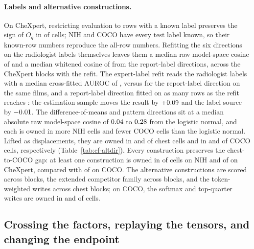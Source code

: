 \documentclass{article}
\begin{document}
\paragraph{Labels and alternative constructions.} On CheXpert, restricting evaluation to rows with a known label preserves the sign of $O_q$ in \cfValKnownSignAgree{} of \cfValKnownN{} cells; NIH and COCO have every test label known, so their known-row numbers reproduce the all-row numbers. Refitting the six directions on the radiologist labels themselves leaves them a median raw model-space cosine of \cfValidfitCosRaw{} and a median whitened cosine of \cfValidfitCosWhitened{} from the report-label directions, across the \cfValidfitBlocks{} CheXpert blocks with the refit. The expert-label refit reads the radiologist labels with a median cross-fitted AUROC of \cfValidfitAurocExpert{}, versus \cfValidfitAurocReportDir{} for the report-label direction on the same films, and a report-label direction fitted on as many rows as the refit reaches \cfVfArmReportSubAuroc{}: the estimation sample moves the result by $+0.09$ and the label source by $-0.01$. The difference-of-means and pattern directions sit at a median absolute raw model-space cosine of $0.04$ to $0.28$ from the logistic normal, and each is owned in more NIH cells and fewer COCO cells than the logistic normal. Lifted as displacements, they are owned in \cfAltdirdChestDom{} and \cfAltdirdChestPattern{} of \cfAltdirdChestN{} chest cells and in \cfAltdirdCocoDom{} and \cfAltdirdCocoPattern{} of \cfAltdirdCocoN{} COCO cells, respectively (Table~\ref{tab:cf-altdir}). Every construction preserves the chest-to-COCO gap: at least one construction is owned in \cfAltdirNihAny{} of \cfAltdirNihN{} cells on NIH and \cfAltdirChexAny{} of \cfAltdirChexN{} on CheXpert, compared with \cfAltdirCocoAny{} of \cfAltdirCocoN{} on COCO. The alternative constructions are scored across \cfAltdirBlocks{} blocks, the extended competitor family across \cfExtcompBlocks{} blocks, and the token-weighted writes across \cfTokenwChestBlocks{} chest blocks; on COCO, the softmax and top-quarter writes are owned in \cfTokenwSoftCocoOwned{} and \cfTokenwTopqCocoOwned{} of \cfTokenwCocoCells{} cells.

\subsection{Crossing the factors, replaying the tensors, and changing the endpoint}
\label{app:cf-crossed}
\end{document}
